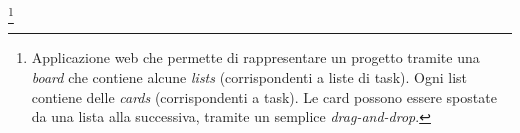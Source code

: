 \footnote{Applicazione web che permette di rappresentare un progetto tramite una \emph{board} che contiene alcune \emph{lists} (corrispondenti a liste
di task). Ogni list contiene delle \emph{cards} (corrispondenti a task). Le card possono essere spostate da una lista alla successiva, tramite un
semplice \emph{drag-and-drop}.}
